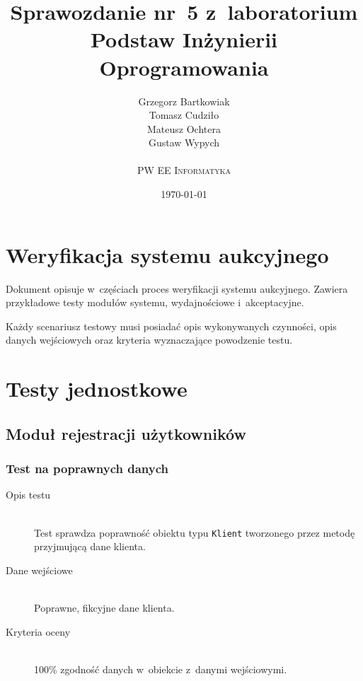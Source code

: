\documentclass[10pt,a4paper]{article}
\newcommand{\f}[1]{\texttt{#1}}
\begin{document}
\title{
  Sprawozdanie nr~5 z~laboratorium\\Podstaw Inżynierii Oprogramowania
}
\author{
  Grzegorz Bartkowiak\\
  Tomasz Cudziło\\
  Mateusz Ochtera\\
  Gustaw Wypych\\
  \\
  \textsc{PW EE Informatyka}\\[10pt]
}
\date{\today}
\maketitle

\section{Weryfikacja systemu aukcyjnego}

Dokument opisuje w~częściach proces weryfikacji systemu aukcyjnego. Zawiera
przykładowe testy modułów systemu, wydajnościowe i~akceptacyjne.

Każdy scenariusz testowy musi posiadać opis wykonywanych czynności, opis danych
wejściowych oraz kryteria wyznaczające powodzenie testu.

\section{Testy jednostkowe}

\subsection{Moduł rejestracji użytkowników}

\subsubsection{Test na poprawnych danych}
\begin{description}
  \item[Opis testu] \hfill \\
    Test sprawdza poprawność obiektu typu \f{Klient} tworzonego przez metodę
    przyjmującą dane klienta.
  \item[Dane wejściowe] \hfill \\
    Poprawne, fikcyjne dane klienta.
  \item[Kryteria oceny] \hfill \\
    100\% zgodność danych w~obiekcie z~danymi wejściowymi.
\end{description}
\end{document}
